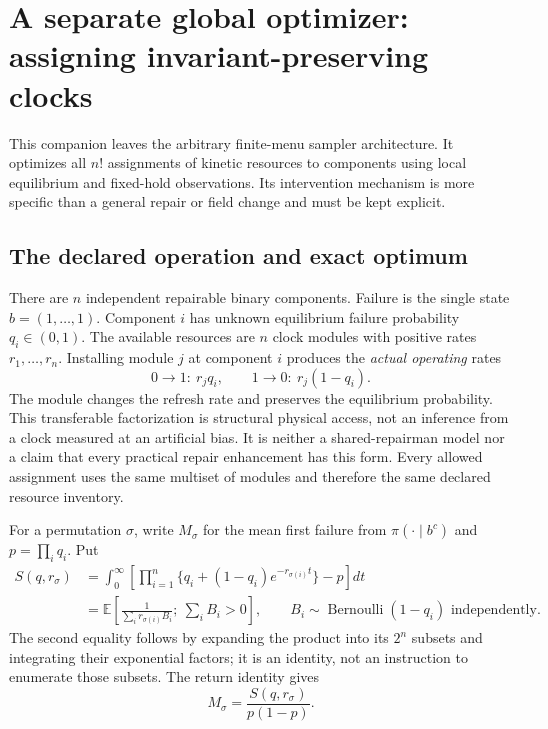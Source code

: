 \section{A separate global optimizer: assigning invariant-preserving clocks}
\label{sec:sortingintervention}

This companion leaves the arbitrary finite-menu sampler architecture.
It optimizes all $n!$ assignments of kinetic resources to components using
local equilibrium and fixed-hold observations.  Its intervention mechanism
is more specific than a general repair or field change and must be kept
explicit.

\subsection{The declared operation and exact optimum}
There are $n$ independent repairable binary components.  Failure is the
single state $b=(1,\ldots,1)$.  Component $i$ has unknown equilibrium
failure probability $q_i\in(0,1)$.  The available resources are $n$ clock
modules with positive rates $r_1,\ldots,r_n$.  Installing module $j$ at
component $i$ produces the \emph{actual operating} rates
\begin{equation}
  0\longrightarrow1:\ r_jq_i,\qquad
  1\longrightarrow0:\ r_j(1-q_i).
  \label{eq:clockmodule}
\end{equation}
The module changes the refresh rate and preserves the equilibrium
probability.  This transferable factorization is structural physical
access, not an inference from a clock measured at an artificial bias.
It is neither a shared-repairman model nor a claim that every practical
repair enhancement has this form.  Every allowed assignment uses the same
multiset of modules and therefore the same declared resource inventory.

For a permutation $\sigma$, write $M_\sigma$ for the mean first failure
from $\pi(\cdot\mid b^c)$ and $p=\prod_iq_i$.  Put
\begin{align}
 S(q,r_\sigma)
 &=\int_0^\infty
 \left[\prod_{i=1}^n\{q_i+(1-q_i)e^{-r_{\sigma(i)}t}\}-p\right]dt\\
 &=\mathbb E\left[\frac1{\sum_i r_{\sigma(i)}B_i};
                        \ \sum_iB_i>0\right],
 \qquad B_i\sim\operatorname{Bernoulli}(1-q_i)
 \text{ independently}.
 \label{eq:weightedbern}
\end{align}
The second equality follows by expanding the product into its $2^n$
subsets and integrating their exponential factors; it is an identity, not
an instruction to enumerate those subsets.  The return identity gives
\[
 M_\sigma=\frac{S(q,r_\sigma)}{p(1-p)}.
\]

